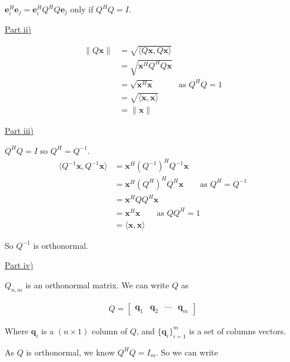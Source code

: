 \documentclass[letterpaper,12pt]{article}
\newcommand{\vect}[1]{\mathbf{#1}}
\begin{document}
$\vect{e}_i^H \vect{e}_j = \vect{e}_i^H Q^H  Q \vect{e}_j$ only if $Q^HQ = I$.

\underline{Part ii)}

\begin{align*}
  \| Q \vect{x} \| &= \sqrt{\langle Q \vect{x}, Q \vect{x} \rangle} \\
  &= \sqrt{\vect{x}^H Q^H Q \vect{x}} \\
  &= \sqrt{\vect{x}^H \vect{x}} \quad \quad \quad \text{as } Q^HQ = 1 \\
  &= \sqrt{\langle \vect{x}, \vect{x} \rangle} \\
  &= \| \vect{x} \|
\end{align*}

\underline{Part iii)}

$Q^HQ = I$ so $Q^H = Q^{-1}$.
\begin{align*}
  \langle Q^{-1} \vect{x}, Q^{-1} \vect{x} \rangle
  &= \vect{x}^H (Q^{-1})^H Q^{-1} \vect{x} \\
  &= \vect{x}^H (Q^H)^H Q^H \vect{x} \quad \quad \text{as } Q^H = Q^{-1} \\
  &= \vect{x}^H Q Q^H \vect{x} \\
  &= \vect{x}^H \vect{x} \quad \quad \text{as } QQ^H = 1 \\
  &= \langle \vect{x}, \vect{x} \rangle
\end{align*}

So $Q^{-1}$ is orthonormal.

\underline{Part iv)}

$Q_{n, m}$ is an orthonormal matrix. We can write $Q$ as

\begin{align*}
  Q =
\begin{bmatrix}
  \vect{q}_1 & \vect{q}_2 & \cdots & \vect{q}_m
\end{bmatrix}
\end{align*}

Where $\vect{q}_i$ is a $(n \times 1)$ column of $Q$, and $\{\vect{q}_i\}_{i=1}^m$ is a set of columns vectors.

As $Q$ is orthonormal, we know $Q^HQ = I_m$. So we can write
\end{document}
